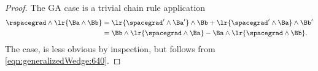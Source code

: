 \begin{proof}
The GA case is a trivial chain rule application
\begin{equation}\label{eqn:vectorcalc:950}
\begin{aligned}
\rspacegrad \wedge \lr{ \Ba \wedge \Bb }
&=
\lr{ \spacegrad' \wedge \Ba'} \wedge \Bb
+
\lr{ \spacegrad' \wedge \Ba } \wedge \Bb' \\
&= \Bb \wedge \lr{ \spacegrad \wedge \Ba } - \Ba \wedge \lr{ \spacegrad \wedge \Bb }.
\end{aligned}
\end{equation}
The  case, is less obvious by inspection, but follows from \cref{eqn:generalizedWedge:640}.
\end{proof}
